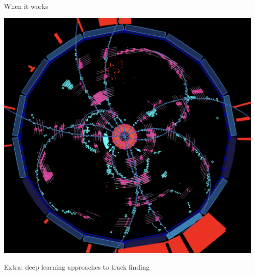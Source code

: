 \documentclass[presentation]{etp-beamer-fancy}
\begin{document}
\begin{frame}[label={sec:org6f7bd4d}]{When it works}
\begin{center}
\includegraphics[width=.5\textwidth]{./figures/b2phase3_1st_bantib_like_event_cropped.png}
\end{center}
\end{frame}
\begin{frame}[label={sec:org2523bb2}]{Extra: deep learning approaches to track finding}
\end{frame}
\end{document}
